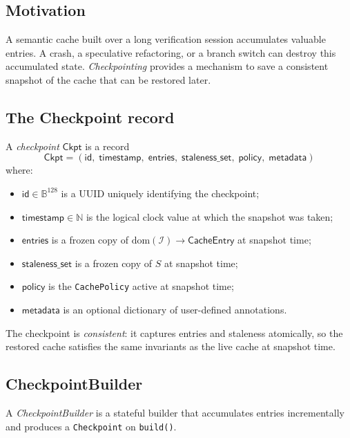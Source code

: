 \documentclass[11pt]{article}
\newcommand{\CacheIndex}{\mathcal{I}}              %
\newcommand{\Checkpoint}{\mathsf{Ckpt}}            %
\begin{document}
\subsection{Motivation}

A semantic cache built over a long verification session accumulates
valuable entries.  A crash, a speculative refactoring, or a branch
switch can destroy this accumulated state.  \emph{Checkpointing}
provides a mechanism to save a consistent snapshot of the cache that
can be restored later.

\subsection{The Checkpoint record}

\begin{definition}[Checkpoint]\label{def:checkpoint}
A \emph{checkpoint} $\Checkpoint$ is a record
\[
  \Checkpoint = (\mathsf{id},\; \mathsf{timestamp},\;
                 \mathsf{entries},\; \mathsf{staleness\_set},\;
                 \mathsf{policy},\; \mathsf{metadata})
\]
where:
\begin{itemize}
\item $\mathsf{id} \in \mathbb{B}^{128}$ is a UUID uniquely identifying
  the checkpoint;
\item $\mathsf{timestamp} \in \mathbb{N}$ is the logical clock value
  at which the snapshot was taken;
\item $\mathsf{entries}$ is a frozen copy of
  $\mathrm{dom}(\CacheIndex) \to \mathsf{CacheEntry}$ at snapshot time;
\item $\mathsf{staleness\_set}$ is a frozen copy of $S$ at snapshot
  time;
\item $\mathsf{policy}$ is the \texttt{CachePolicy} active at snapshot
  time;
\item $\mathsf{metadata}$ is an optional dictionary of user-defined
  annotations.
\end{itemize}
\end{definition}

The checkpoint is \emph{consistent}: it captures entries and staleness
atomically, so the restored cache satisfies the same invariants as the
live cache at snapshot time.

\subsection{CheckpointBuilder}

\begin{definition}[CheckpointBuilder]\label{def:ckpt-builder}
A \emph{CheckpointBuilder} is a stateful builder that accumulates
entries incrementally and produces a \texttt{Checkpoint} on
\texttt{build()}.
\end{definition}
\end{document}
